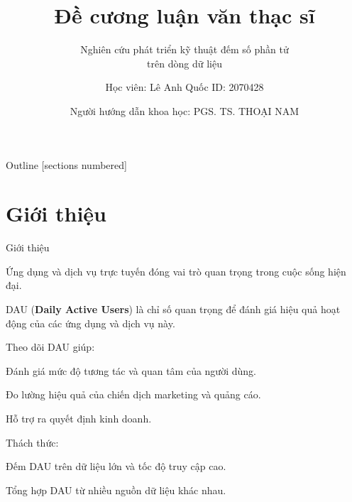 \documentclass[10pt]{beamer}
\title{Đề cương luận văn thạc sĩ}
\subtitle{Nghiên cứu phát triển kỹ thuật đếm số phần tử \\ \hspace{2.4cm} trên dòng dữ liệu}
\date{Người hướng dẫn khoa học: \hspace{0.5cm}PGS. TS. THOẠI NAM}
\author{Học viên: Lê Anh Quốc \hspace{1cm} ID: 2070428}
\newcommand{\SubItem}[1]{
    {\setlength\itemindent{15pt} \item[-] #1}
}
\begin{document}
\maketitle

\begin{frame}{Outline}
  [sections numbered]
  \tableofcontents[hideallsubsections]
\end{frame}

\section{Giới thiệu}

\begin{frame}[fragile]{Giới thiệu}

\begin{itemize}
  \item Ứng dụng và dịch vụ trực tuyến đóng vai trò quan trọng trong cuộc sống hiện đại.
  \item DAU (\textbf{Daily Active Users}) là chỉ số quan trọng để đánh giá hiệu quả hoạt động của các ứng dụng và dịch vụ này.
  \item Theo dõi DAU giúp:
  \SubItem{Đánh giá mức độ tương tác và quan tâm của người dùng.}
  \SubItem{Đo lường hiệu quả của chiến dịch marketing và quảng cáo.}
  \SubItem{Hỗ trợ ra quyết định kinh doanh.}
  \item Thách thức:
  \SubItem{Đếm DAU trên dữ liệu lớn và tốc độ truy cập cao.}
  \SubItem{Tổng hợp DAU từ nhiều nguồn dữ liệu khác nhau.}
\end{itemize}
\end{frame}
\end{document}

